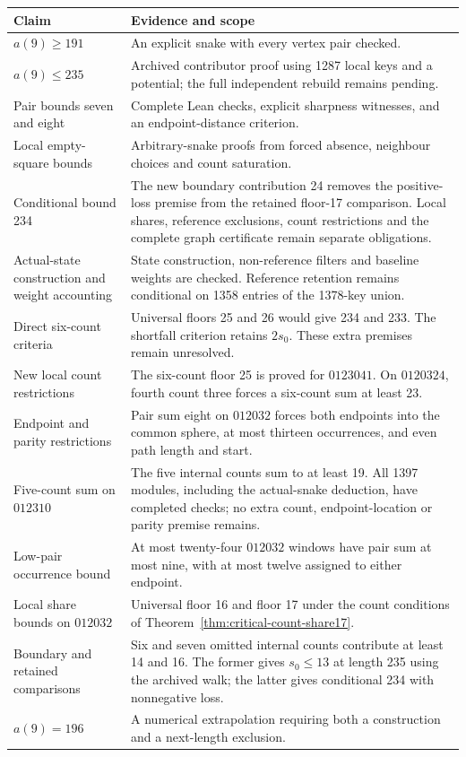 \documentclass[11pt,a4paper]{article}
\theoremstyle{definition}
\theoremstyle{remark}
\begin{document}
\begin{center}
\begin{tabular}{p{}p{}}
\toprule
Claim & Evidence and scope\\\midrule
$a(9)\ge191$ & An explicit snake with every vertex pair checked.\\
$a(9)\le235$ & Archived contributor proof using 1287 local keys and a potential; the full independent rebuild remains pending.\\
Pair bounds seven and eight & Complete Lean checks, explicit sharpness witnesses, and an endpoint-distance criterion.\\
Local empty-square bounds & Arbitrary-snake proofs from forced absence, neighbour choices and count saturation.\\
Conditional bound 234 & The new boundary contribution 24 removes the positive-loss premise from the retained floor-17 comparison. Local shares, reference exclusions, count restrictions and the complete graph certificate remain separate obligations.\\
Actual-state construction and weight accounting & State construction, non-reference filters and baseline weights are checked. Reference retention remains conditional on 1358 entries of the 1378-key union.\\
Direct six-count criteria & Universal floors 25 and 26 would give 234 and 233. The shortfall criterion retains $2s_0$. These extra premises remain unresolved.\\
New local count restrictions & The six-count floor 25 is proved for $0123041$. On $0120324$, fourth count three forces a six-count sum at least 23.\\
Endpoint and parity restrictions & Pair sum eight on $012032$ forces both endpoints into the common sphere, at most thirteen occurrences, and even path length and start.\\
Five-count sum on $012310$ & The five internal counts sum to at least 19. All 1397 modules, including the actual-snake deduction, have completed checks; no extra count, endpoint-location or parity premise remains.\\
Low-pair occurrence bound & At most twenty-four $012032$ windows have pair sum at most nine, with at most twelve assigned to either endpoint.\\
Local share bounds on $012032$ & Universal floor 16 and floor 17 under the count conditions of Theorem~\ref{thm:critical-count-share17}.\\
Boundary and retained comparisons & Six and seven omitted internal counts contribute at least 14 and 16. The former gives $s_0\le13$ at length 235 using the archived walk; the latter gives conditional 234 with nonnegative loss.\\
$a(9)=196$ & A numerical extrapolation requiring both a construction and a next-length exclusion.\\
\bottomrule
\end{tabular}
\end{center}
\end{document}
